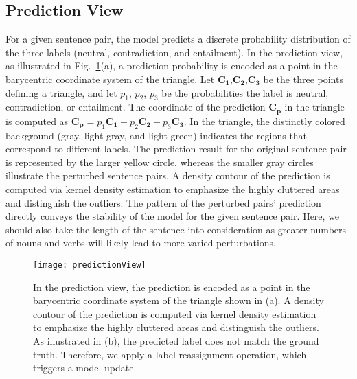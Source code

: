 
\subsection{Prediction View}
\label{sec:prediction}
For a given sentence pair, the model predicts a discrete probability distribution of the three labels (neutral, contradiction, and entailment).
%
In the prediction view, as illustrated in Fig.~\ref{fig:predictionView}(a), a prediction probability is encoded as a point in the barycentric coordinate system of the triangle.
Let $\mathbf{C_1}$,$\mathbf{C_2}$,$\mathbf{C_3}$ be the three points defining a triangle, and let $p_1$, $p_2$, $p_3$ be the probabilities the label is neutral, contradiction, or entailment. The coordinate of the prediction $\mathbf{C_p}$ in the triangle is computed as $\mathbf{C_p} = p_1\mathbf{C_1}+p_2\mathbf{C_2}+p_3\mathbf{C_3}$.
In the triangle, the distinctly colored background (gray, light gray, and light green) indicates the regions that correspond to different labels. The prediction result for the original sentence pair is represented by the larger yellow circle, whereas the smaller gray circles illustrate the perturbed sentence pairs. 
A density contour of the prediction is computed via kernel density estimation to emphasize the highly cluttered areas and distinguish the outliers.
The pattern of the perturbed pairs' prediction directly conveys the stability of the model for the given sentence pair. 
Here, we should also take the length of the sentence into consideration as greater numbers of nouns and verbs will likely lead to more varied perturbations.

\begin{figure}[htbp]
\centering
\vspace{-4mm}
 \texttt{[image: predictionView]}
 \vspace{-3mm}
 \caption{
In the prediction view, the prediction is encoded as a point in the barycentric coordinate system of the triangle shown in (a).
A density contour of the prediction is computed via kernel density estimation to emphasize the highly cluttered areas and distinguish the outliers.
As illustrated in (b), the predicted label does not match the ground truth. Therefore, we apply a label reassignment operation, which triggers a model update.
}
\vspace{-2mm}
\label{fig:predictionView}
\end{figure}

